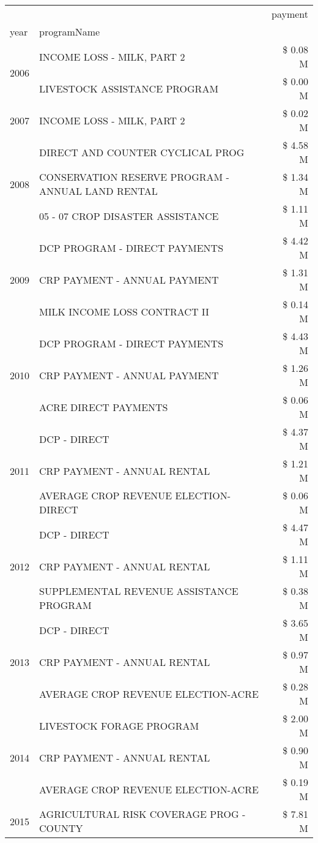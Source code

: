 \begin{tabular}{llr}
\toprule
 &  & payment \\
year & programName &  \\
\midrule
\multirow[t]{2}{*}{2006} & INCOME LOSS - MILK, PART 2 & \$ 0.08 M \\
 & LIVESTOCK ASSISTANCE PROGRAM & \$ 0.00 M \\
\cline{1-3}
2007 & INCOME LOSS - MILK, PART 2 & \$ 0.02 M \\
\cline{1-3}
\multirow[t]{3}{*}{2008} & DIRECT AND COUNTER CYCLICAL PROG & \$ 4.58 M \\
 & CONSERVATION RESERVE PROGRAM - ANNUAL LAND RENTAL & \$ 1.34 M \\
 & 05 - 07 CROP DISASTER ASSISTANCE & \$ 1.11 M \\
\cline{1-3}
\multirow[t]{3}{*}{2009} & DCP PROGRAM - DIRECT PAYMENTS & \$ 4.42 M \\
 & CRP PAYMENT - ANNUAL PAYMENT & \$ 1.31 M \\
 & MILK INCOME LOSS CONTRACT II & \$ 0.14 M \\
\cline{1-3}
\multirow[t]{3}{*}{2010} & DCP PROGRAM - DIRECT PAYMENTS & \$ 4.43 M \\
 & CRP PAYMENT - ANNUAL PAYMENT & \$ 1.26 M \\
 & ACRE DIRECT PAYMENTS & \$ 0.06 M \\
\cline{1-3}
\multirow[t]{3}{*}{2011} & DCP - DIRECT & \$ 4.37 M \\
 & CRP PAYMENT - ANNUAL RENTAL & \$ 1.21 M \\
 & AVERAGE CROP REVENUE ELECTION-DIRECT & \$ 0.06 M \\
\cline{1-3}
\multirow[t]{3}{*}{2012} & DCP - DIRECT & \$ 4.47 M \\
 & CRP PAYMENT - ANNUAL RENTAL & \$ 1.11 M \\
 & SUPPLEMENTAL REVENUE ASSISTANCE PROGRAM & \$ 0.38 M \\
\cline{1-3}
\multirow[t]{3}{*}{2013} & DCP - DIRECT & \$ 3.65 M \\
 & CRP PAYMENT - ANNUAL RENTAL & \$ 0.97 M \\
 & AVERAGE CROP REVENUE ELECTION-ACRE & \$ 0.28 M \\
\cline{1-3}
\multirow[t]{3}{*}{2014} & LIVESTOCK FORAGE PROGRAM & \$ 2.00 M \\
 & CRP PAYMENT - ANNUAL RENTAL & \$ 0.90 M \\
 & AVERAGE CROP REVENUE ELECTION-ACRE & \$ 0.19 M \\
\cline{1-3}
\multirow[t]{3}{*}{2015} & AGRICULTURAL RISK COVERAGE PROG - COUNTY & \$ 7.81 M \\

\end{tabular}
